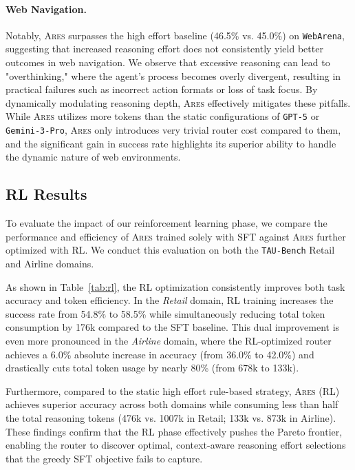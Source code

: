 \documentclass{article}
\newcommand{\ares}{\textsc{Ares}}
\theoremstyle{plain}
\theoremstyle{definition}
\theoremstyle{remark}
\begin{document}
\paragraph{Web Navigation.} 
Notably, {\ares} surpasses the high effort baseline (46.5\% vs. 45.0\%) on \texttt{WebArena}, suggesting that increased reasoning effort does not consistently yield better outcomes in web navigation. We observe that excessive reasoning can lead to "overthinking," where the agent's process becomes overly divergent, resulting in practical failures such as incorrect action formats or loss of task focus. By dynamically modulating reasoning depth, {\ares} effectively mitigates these pitfalls. While {\ares} utilizes more tokens than the static configurations of \texttt{GPT-5} or \texttt{Gemini-3-Pro}, {\ares} only introduces very trivial router cost compared to them, and the significant gain in success rate highlights its superior ability to handle the dynamic nature of web environments.

\subsection{RL Results}

To evaluate the impact of our reinforcement learning phase, we compare the performance and efficiency of \textsc{Ares} trained solely with SFT against \textsc{Ares} further optimized with RL. We conduct this evaluation on both the \texttt{TAU-Bench} Retail and Airline domains. 

As shown in Table~\ref{tab:rl}, the RL optimization consistently improves both task accuracy and token efficiency. In the \emph{Retail} domain, RL training increases the success rate from 54.8\% to 58.5\% while simultaneously reducing total token consumption by 176k compared to the SFT baseline. This dual improvement is even more pronounced in the \emph{Airline} domain, where the RL-optimized router achieves a 6.0\% absolute increase in accuracy (from 36.0\% to 42.0\%) and drastically cuts total token usage by nearly 80\% (from 678k to 133k).

Furthermore, compared to the static high effort rule-based strategy, \textsc{Ares} (RL) achieves superior accuracy across both domains while consuming less than half the total reasoning tokens (476k vs. 1007k in Retail; 133k vs. 873k in Airline). These findings confirm that the RL phase effectively pushes the Pareto frontier, enabling the router to discover optimal, context-aware reasoning effort selections that the greedy SFT objective fails to capture.
\end{document}
